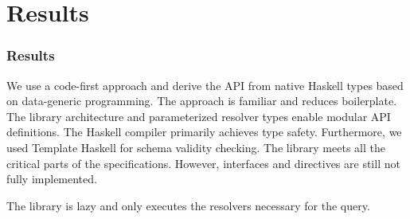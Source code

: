 \section{Results}

\begin{frame}\frametitle{Results}

\begin{itemize}
   We use a code-first approach and derive the API from native Haskell types based on data-generic programming. The approach is familiar and reduces boilerplate. The library architecture and parameterized resolver types enable modular API definitions.
   The Haskell compiler primarily achieves type safety. Furthermore, we used Template Haskell for schema validity checking. The library meets all the critical parts of the specifications. However, interfaces and directives are still not fully implemented. 

   The library is lazy and only executes the resolvers necessary for the query. 

\end{itemize}
\end{frame}

